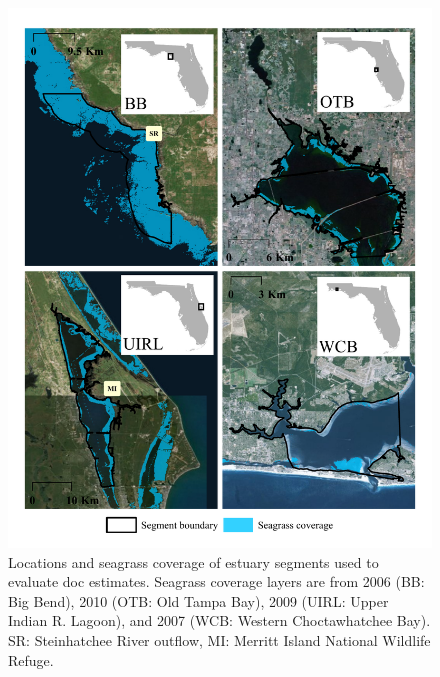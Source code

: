 \documentclass[letterpaper,12pt,oneside]{article}\usepackage[]{graphicx}\usepackage[]{color}
\begin{document}
\begin{figure}
\centerline{\includegraphics[width = \textwidth]{figs/Fig2.pdf}}
\caption{Locations and seagrass coverage of estuary segments used to evaluate \acl{doc} estimates.  Seagrass coverage layers are from 2006 (BB: Big Bend), 2010 (OTB: Old Tampa Bay), 2009 (UIRL: Upper Indian R. Lagoon), and 2007 (WCB: Western Choctawhatchee Bay). SR: Steinhatchee River outflow, MI: Merritt Island National Wildlife Refuge.}
\label{fig:seg_all}
\end{figure}

\end{document}
